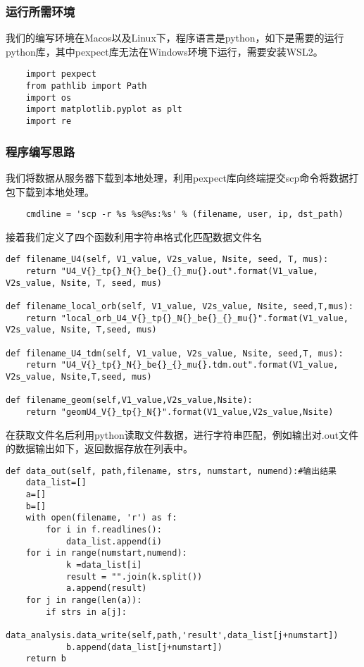 \subsubsection{运行所需环境}
我们的编写环境在Macos以及Linux下，程序语言是python，如下是需要的运行python库，其中pexpect库无法在Windows环境下运行，需要安装WSL2。
\begin{lstlisting}
    import pexpect
    from pathlib import Path
    import os
    import matplotlib.pyplot as plt
    import re
\end{lstlisting}

\subsubsection{程序编写思路}
我们将数据从服务器下载到本地处理，利用pexpect库向终端提交scp命令将数据打包下载到本地处理\cite{}。
\begin{lstlisting}
    cmdline = 'scp -r %s %s@%s:%s' % (filename, user, ip, dst_path)
\end{lstlisting}
接着我们定义了四个函数利用字符串格式化匹配数据文件名
\begin{lstlisting}
def filename_U4(self, V1_value, V2s_value, Nsite, seed, T, mus):
    return "U4_V{}_tp{}_N{}_be{}_{}_mu{}.out".format(V1_value, V2s_value, Nsite, T, seed, mus)

def filename_local_orb(self, V1_value, V2s_value, Nsite, seed,T,mus):
    return "local_orb_U4_V{}_tp{}_N{}_be{}_{}_mu{}".format(V1_value, V2s_value, Nsite, T,seed, mus)

def filename_U4_tdm(self, V1_value, V2s_value, Nsite, seed,T, mus):
    return "U4_V{}_tp{}_N{}_be{}_{}_mu{}.tdm.out".format(V1_value, V2s_value, Nsite,T,seed, mus)

def filename_geom(self,V1_value,V2s_value,Nsite):
    return "geomU4_V{}_tp{}_N{}".format(V1_value,V2s_value,Nsite)
\end{lstlisting}
在获取文件名后利用python读取文件数据，进行字符串匹配，例如输出对.out文件的数据输出如下，返回数据存放在列表中。
\begin{lstlisting}
def data_out(self, path,filename, strs, numstart, numend):#输出结果
    data_list=[]
    a=[]
    b=[]
    with open(filename, 'r') as f:
        for i in f.readlines():
            data_list.append(i)
    for i in range(numstart,numend):
            k =data_list[i]
            result = "".join(k.split())
            a.append(result)
    for j in range(len(a)):
        if strs in a[j]:
            data_analysis.data_write(self,path,'result',data_list[j+numstart])
            b.append(data_list[j+numstart])
    return b
\end{lstlisting}
